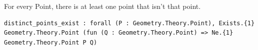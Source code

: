 
\begin{theorem}
  \label{Geometry.Theory.Point.distinct_points_exist}
  \leanok
  For every Point, there is at least one point that isn't that point. 
\begin{verbatim}distinct_points_exist : forall (P : Geometry.Theory.Point), Exists.{1} Geometry.Theory.Point (fun (Q : Geometry.Theory.Point) => Ne.{1} Geometry.Theory.Point P Q)\end{verbatim}
\end{theorem}
